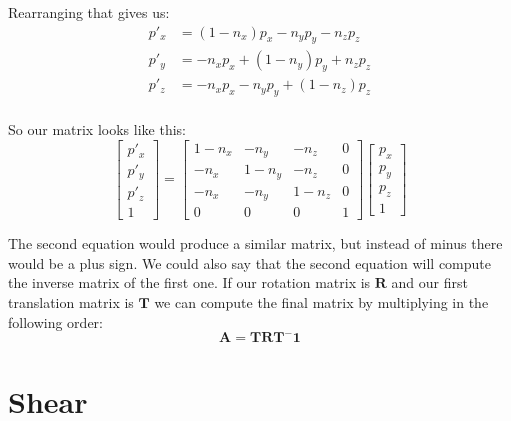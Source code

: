 \documentclass[]{report}   %
\begin{document}
Rearranging that gives us:
\begin{align*}
	p\prime_x &= (1 - n_x) p_x - n_y p_y - n_z p_z		\\
	p\prime_y &= - n_x p_x + (1 -n_y) p_y + n_z p_z		\\
	p\prime_z &= - n_x p_x - n_y p_y + (1 - n_z) p_z	\\
\end{align*}

So our matrix looks like this:
\[
	\begin{bmatrix}
	p\prime_x \\
	p\prime_y \\
	p\prime_z \\
	1
	\end{bmatrix}
	=
	\begin{bmatrix}
	1 - n_x			&	- n_y		&	- n_z		&	0	\\
	- n_x			&	1 -n_y		&	- n_z		&	0	\\
	- n_x			&	- n_y		&	1 - n_z		&	0	\\
		0			&	0			&	0			&	1
	\end{bmatrix}
	\begin{bmatrix}
	p_x \\
	p_y \\
	p_z \\
	1
	\end{bmatrix}	
\]

The second equation would produce a similar matrix, but instead of minus there would be a plus sign. We could also say that the second equation will compute the inverse matrix of the first one. If our rotation matrix is \(\mathbf{R}\) and our first translation matrix is \(\mathbf{T}\) we can compute the final matrix by multiplying in the following order:
\[
	\mathbf{A} = \mathbf{T} \mathbf{R} \mathbf{T^-1}
\]



\section{Shear}
\end{document}
